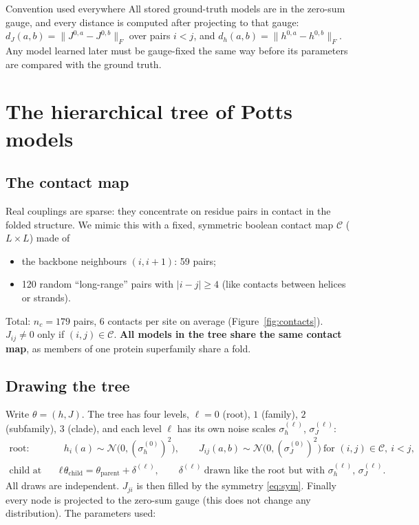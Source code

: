 \documentclass[11pt,a4paper]{article}
\begin{document}
\begin{keybox}{Convention used everywhere}
All stored ground-truth models are in the zero-sum gauge, and every distance is computed after
projecting to that gauge: $d_J(a,b)=\big\|J^{0,a}-J^{0,b}\big\|_F$ over pairs $i<j$, and
$d_h(a,b)=\|h^{0,a}-h^{0,b}\|_F$. Any model learned later must be gauge-fixed the same way before
its parameters are compared with the ground truth.
\end{keybox}

\section{The hierarchical tree of Potts models}\label{sec:tree}
\subsection{The contact map}\label{sec:contacts}
Real couplings are sparse: they concentrate on residue pairs in contact in the folded structure.
We mimic this with a fixed, symmetric boolean contact map $\mathcal{C}$ ($L\times L$) made of
\begin{itemize}[nosep]
  \item the backbone neighbours $(i,i+1)$: 59 pairs;
  \item 120 random ``long-range'' pairs with $|i-j|\ge 4$ (like contacts between helices or strands).
\end{itemize}
Total: $n_c=179$ pairs, 6 contacts per site on average (Figure~\ref{fig:contacts}). $J_{ij}\neq0$ only if
$(i,j)\in\mathcal{C}$. \textbf{All models in the tree share the same contact map}, as members of one
protein superfamily share a fold.

\subsection{Drawing the tree}
Write $\theta=(h,J)$. The tree has four levels, $\ell=0$ (root), $1$ (family), $2$ (subfamily),
$3$ (clade), and each level $\ell$ has its own noise scales $\sigma_h^{(\ell)}$, $\sigma_J^{(\ell)}$:
\begin{align}
\text{root:}\quad & h_i(a)\sim\mathcal{N}\big(0,(\sigma_h^{(0)})^2\big),\qquad
    J_{ij}(a,b)\sim\mathcal{N}\big(0,(\sigma_J^{(0)})^2\big)\ \text{for }(i,j)\in\mathcal{C},\ i<j,\\
\text{child at level }\ell:\quad & \theta_{\text{child}} = \theta_{\text{parent}} + \delta^{(\ell)},\qquad
  \delta^{(\ell)}\ \text{drawn like the root but with } \sigma_h^{(\ell)},\,\sigma_J^{(\ell)} .
\end{align}
All draws are independent. $J_{ji}$ is then filled by the symmetry \eqref{eq:sym}. Finally every node is
projected to the zero-sum gauge (this does not change any distribution). The parameters used:
\end{document}
